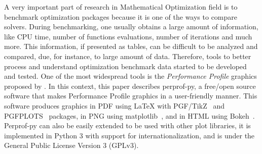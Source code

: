 A very important part of research in Mathematical Optimization field is to benchmark
optimization packages because it is one of the ways to compare
solvers.
During benchmarking, one usually
obtains a large amount of information, like CPU time, number of functions
evaluations, number of iterations and much more. This information, if
presented as tables, can be difficult to be analyzed and compared, due, for instance, to
large amount of data.  Therefore, 
tools to better process and understand optimization benchmark data  started to be developed and tested. One of
the most widespread tools  is the \emph{Performance Profile} graphics proposed by
\textcite{Dolan:2002du}. In this context, this paper describes  perprof-py, a free/open source software
that makes Performance Profile graphics in a user-friendly manner. This software produces graphics in PDF using LaTeX with
PGF/TikZ~\cite{TikZ} and PGFPLOTS~\cite{pgfplots} packages, in
PNG using matplotlib~\cite{Hunter:2007}, and in HTML using
Bokeh~\cite{url:bokeh}. Perprof-py  can also be easily
extended to be used with other plot libraries,  it is implemented
in Python 3 with support for internationalization, and is under the General
Public License Version 3 (GPLv3).
